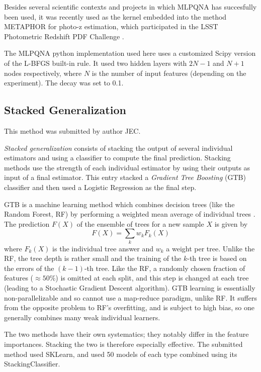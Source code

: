 \documentclass[twocolumn,twocolappendix]{aastex63}
\begin{document}
Besides several scientific contexts and projects in which MLPQNA has succesfully
been used, it was recently used as the kernel embedded into the method {\sc
METAPHOR} \citep{cavuoti20} for photo-z estimation, which participated in the
LSST Photometric Redshift PDF Challenge \citep{schmidt20}. 

The {\sc MLPQNA} python implementation used here
uses a customized Scipy version of the L-BFGS built-in rule.
It used two hidden layers with $2N-1$ and $N+1$ nodes respectively,
where $N$ is the number of input features (depending on the experiment).
The decay was set to 0.1.


\subsection{ {\sc Stacked Generalization} }
This method was submitted by author JEC.

\emph{Stacked generalization} consists of stacking the output of several individual estimators and 
using a classifier to compute the final prediction. Stacking methods use the strength of each 
individual estimator by using their outputs as input of a final estimator.  This entry stacked
a \emph{Gradient Tree Boosting} (GTB) classifier and then used a Logistic Regression as the final step.

GTB is a machine learning method which combines decision trees (like the Random Forest, RF)
by performing a weighted mean average of individual trees \citep{Friedman:2002we,RefWorks:1634}. 
The prediction $F(X)$ of the ensemble of trees for a new sample $X$ is given by
\begin{equation}
F(X) = \sum_k w_k F_k(X)
\end{equation}
where $F_k(X)$ is the individual tree answer and $w_k$ a weight per tree. Unlike the RF, the 
tree depth is rather small and the training  of the $k$-th tree is based on the errors of the
$(k-1)$-th tree.  Like the RF, a randomly chosen fraction of features ($\approx 50\%$) is 
omitted at each split, and this step is changed at each tree (leading to a Stochastic Gradient Descent 
algorithm).  GTB learning is essentially non-parallelizable and so cannot use a map-reduce paradigm, 
unlike RF. It suffers from the opposite problem to RF's overfitting, and is subject
to high bias, so one generally combines many weak individual learners.

The two methods have their own systematics; they notably differ in the feature importances. Stacking 
the two is therefore especially effective.  The submitted method used {\sc SKLearn}, and used 50 models 
of each type combined using its {\sc StackingClassifier}.
\end{document}

